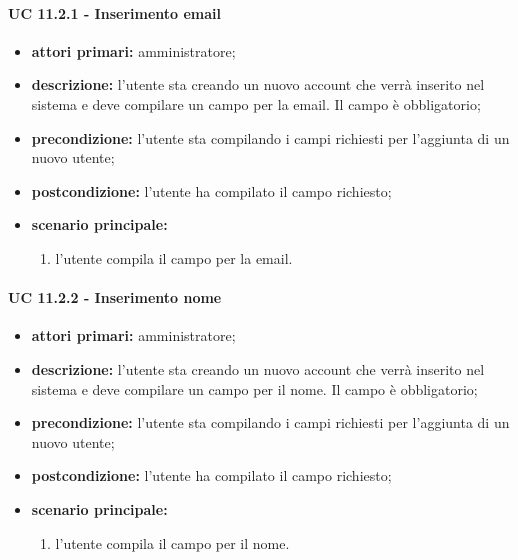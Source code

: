 			\paragraph{UC 11.2.1 - Inserimento email}
			\begin{itemize}
				\item \textbf{attori primari:} amministratore;
				\item \textbf{descrizione:} l'utente sta creando un nuovo account che verrà inserito nel sistema e deve compilare un campo per la email. Il campo è obbligatorio;
				\item \textbf{precondizione:} l'utente sta compilando i campi richiesti per l'aggiunta di un nuovo utente;
				\item \textbf{postcondizione:} l'utente ha compilato il campo richiesto;
				\item \textbf{scenario principale:}
				\begin{enumerate}
					\item{l'utente compila il campo per la email.}
				\end{enumerate}
			\end{itemize}

			\paragraph{UC 11.2.2 - Inserimento nome}
			\begin{itemize}
				\item \textbf{attori primari:} amministratore;
				\item \textbf{descrizione:} l'utente sta creando un nuovo account che verrà inserito nel sistema e deve compilare un campo per il nome. Il campo è obbligatorio;
				\item \textbf{precondizione:} l'utente sta compilando i campi richiesti per l'aggiunta di un nuovo utente;
				\item \textbf{postcondizione:} l'utente ha compilato il campo richiesto;
				\item \textbf{scenario principale:}
				\begin{enumerate}
					\item{l'utente compila il campo per il nome.}
				\end{enumerate}
			\end{itemize}

